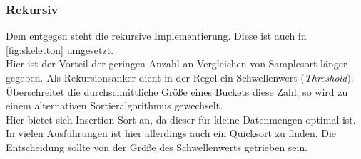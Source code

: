 		\subsubsection{Rekursiv}
			Dem entgegen steht die rekursive Implementierung.
			Diese ist auch in \ref{fig:skeletton} umgesetzt.\\
			Hier ist der Vorteil der geringen Anzahl an Vergleichen von Samplesort länger gegeben. Als Rekursionsanker dient in der Regel ein Schwellenwert (\textit{Threshold}).
			Überschreitet die durchschnittliche Größe eines Buckets diese Zahl, so wird zu einem alternativen Sortieralgorithmus gewechselt. \\
			Hier bietet sich Insertion Sort an, da dieser für kleine Datenmengen optimal ist. \autocite{geeksforgeeks-2021} 
			In vielen Ausführungen ist hier allerdings auch ein Quicksort zu finden.
			Die Entscheidung sollte von der Größe des Schwellenwerts getrieben sein.
